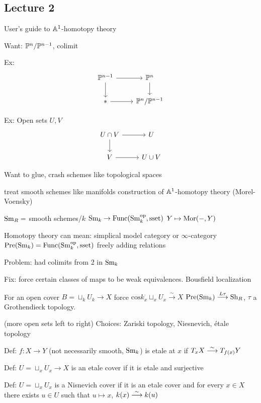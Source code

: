 \newpage
\subsection{Lecture 2}


User's guide to $\A^1$-homotopy theory

Want: $\P^n/\P^{n-1}$, colimit

Ex:
	\[
	\begin{tikzcd}
	\P^{n-1} \arrow{r} \arrow{d} & \P^n \arrow{d} \\
	* \arrow{r} & \P^n/\P^{n-1}
	\end{tikzcd}
	\]

Ex: Open sets $U,V$
	\[
	\begin{tikzcd}
	U \cap V \arrow{r} \arrow{d} & U \\
	V \arrow{r} & U \cup V
	\end{tikzcd}
	\]

Want to glue, crash schemes like topological spaces

treat smooth schemes like manifolds
construction of $\A^1$-homotopy theory (Morel-Voensky)

$\sm_R=$ smooth schemes/$k$
$\sm_k \to \func(\sm_k^\text{op}, \text{sset})$
$Y \mapsto \mor(-,Y)$


Homotopy theory can mean: simplical model category or $\infty$-category
$\pre(\sm_k)= \func(\sm_k^\text{op}, \text{sset})$ freely adding relations

Problem: had colimits from 2 in $\sm_k$

Fix: force certain classes of maps to be weak equivalences. Bousfield localization

For an open cover $B= \sqcup_k U_k \to X$
force $\text{cos}k_x^\cdot \sqcup_x U_x \stackrel{\sim}{\to} X$
$\pre(\sm_k) \ma{L\tau} \sh_R$, $\tau$ a Grothendieck topology. 


(more open sets left to right)
Choices: Zariski topology, Niesnevich, \'etale topology



Def: $f: X \to Y$ (not necessarily smooth, $\sm_k$)
is etale at $x$ if $T_x X \ma{\sim} T_{f(x)} Y$


Def: $U= \sqcup_x U_x \to X$ is an etale cover if it is etale and surjective

Def: $U= \sqcup_x U_x$ is a Nisnevich cover if it is an etale cover and for every $x \in X$ there exists $u \in U$ such that $u \mapsto x$, $k(x) \ma{\sim} k(u)$


